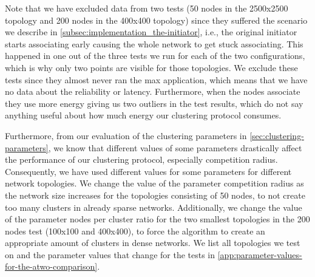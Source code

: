 Note that we have excluded data from two tests (50 nodes in the 2500x2500 topology and 200 nodes in the 400x400 topology) since they suffered the scenario we describe in \cref{subsec:implementation_the-initiator}, i.e., the original initiator starts associating early causing the whole network to get stuck associating. This happened in one out of the three tests we run for each of the two configurations, which is why only two points are visible for those topologies. We exclude these tests since they almost never ran the max application, which means that we have no data about the reliability or latency. Furthermore, when the nodes associate they use more energy giving us two outliers in the test results, which do not say anything useful about how much energy our clustering protocol consumes.

Furthermore, from our evaluation of the clustering parameters in \cref{sec:clustering-parameters}, we know that different values of some parameters drastically affect the performance of our clustering protocol, especially competition radius. Consequently, we have used different values for some parameters for different network topologies. We change the value of the parameter competition radius as the network size increases for the topologies consisting of 50 nodes, to not create too many clusters in already sparse networks. Additionally, we change the value of the parameter nodes per cluster ratio for the two smallest topologies in the 200 nodes test (100x100 and 400x400), to force the algorithm to create an appropriate amount of clusters in dense networks. We list all topologies we test on and the parameter values that change for the tests in \cref{app:parameter-values-for-the-atwo-comparison}.


